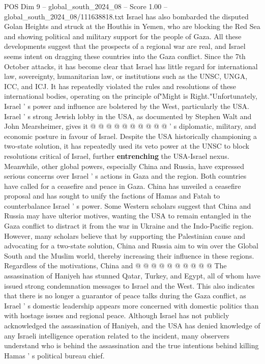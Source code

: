 \begin{textsample}{POS Dim 9 – global\_south\_2024\_08 – Score 1.00 – global\_south\_2024\_08/111638818.txt}
Israel has also bombarded the disputed Golan Heights and struck at the Houthis in Yemen, who are blocking the Red Sea and showing political and military support for the people of Gaza.
All these developments suggest that the prospects of a regional war are real, and Israel seems intent on dragging these countries into the Gaza conflict.
Since the 7th October attacks, it has become clear that Israel has little regard for international law, sovereignty, humanitarian law, or institutions such as the UNSC, UNGA, ICC, and ICJ.
It has repeatedly violated the rules and resolutions of these international bodies, operating on the principle of"Might is Right."Unfortunately, Israel ' s power and influence are bolstered by the West, particularly the USA.
Israel ' s strong Jewish lobby in the USA, as documented by Stephen Walt and John Mearsheimer, gives it @ @ @ @ @ @ @ @ @ @ ' s diplomatic, military, and economic posture in favour of Israel.
Despite the USA historically championing a two-state solution, it has repeatedly used its veto power at the UNSC to block resolutions critical of Israel, further \textbf{entrenching} the USA-Israel nexus.
Meanwhile, other global powers, especially China and Russia, have expressed serious concerns over Israel ' s actions in Gaza and the region.
Both countries have called for a ceasefire and peace in Gaza.
China has unveiled a ceasefire proposal and has sought to unify the factions of Hamas and Fatah to counterbalance Israel ' s power.
Some Western scholars suggest that China and Russia may have ulterior motives, wanting the USA to remain entangled in the Gaza conflict to distract it from the war in Ukraine and the Indo-Pacific region.
However, many scholars believe that by supporting the Palestinian cause and advocating for a two-state solution, China and Russia aim to win over the Global South and the Muslim world, thereby increasing their influence in these regions.
Regardless of the motivations, China and @ @ @ @ @ @ @ @ @ @ The assassination of Haniyeh has stunned Qatar, Turkey, and Egypt, all of whom have issued strong condemnation messages to Israel and the West.
This also indicates that there is no longer a guarantor of peace talks during the Gaza conflict, as Israel ' s domestic leadership appears more concerned with domestic politics than with hostage issues and regional peace.
Although Israel has not publicly acknowledged the assassination of Haniyeh, and the USA has denied knowledge of any Israeli intelligence operation related to the incident, many observers understand who is behind the assassination and the true intentions behind killing Hamas ' s political bureau chief.

\end{textsample}

